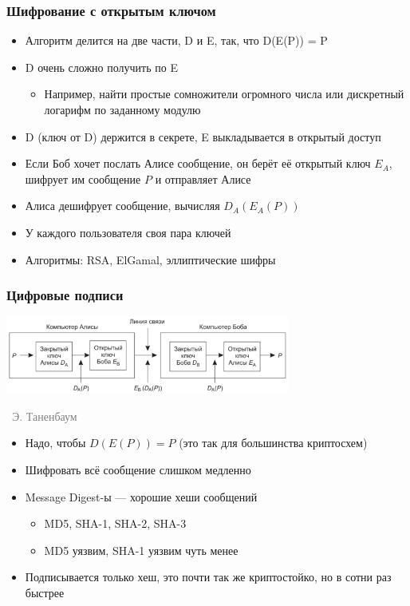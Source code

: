 \documentclass[xetex,mathserif,serif]{beamer}
\newcommand{\attribution}[1] {
\vspace{-5mm}\begin{flushright}\begin{scriptsize}\textcolor{gray}{\textcopyright\, #1}\end{scriptsize}\end{flushright}
}
\begin{document}
    \begin{frame}
        \frametitle{Шифрование с открытым ключом}
        \begin{itemize}
            \item Алгоритм делится на две части, D и E, так, что D(E(P)) = P
            \item D очень сложно получить по E
            \begin{itemize}
                \item Например, найти простые сомножители огромного числа или дискретный логарифм по заданному модулю
            \end{itemize}
            \item D (ключ от D) держится в секрете, E выкладывается в открытый доступ
            \item Если Боб хочет послать Алисе сообщение, он берёт её открытый ключ $E_A$, шифрует им сообщение $P$ и отправляет Алисе
            \item Алиса дешифрует сообщение, вычисляя $D_A(E_A(P))$
            \item У каждого пользователя своя пара ключей
            \item Алгоритмы: RSA, ElGamal, эллиптические шифры
        \end{itemize}
    \end{frame}

    \begin{frame}
        \frametitle{Цифровые подписи}
        \begin{center}
            \includegraphics[width=0.7\textwidth]{signature.png}
            \attribution{Э. Таненбаум}
        \end{center}
        \begin{itemize}
            \item Надо, чтобы $D(E(P)) = P$ (это так для большинства криптосхем)
            \item Шифровать всё сообщение слишком медленно
            \item Message Digest-ы --- хорошие хеши сообщений
            \begin{itemize}
                \item MD5, SHA-1, SHA-2, SHA-3
                \item MD5 уязвим, SHA-1 уязвим чуть менее
            \end{itemize}
            \item Подписывается только хеш, это почти так же криптостойко, но в сотни раз быстрее
        \end{itemize}
    \end{frame}
\end{document}
